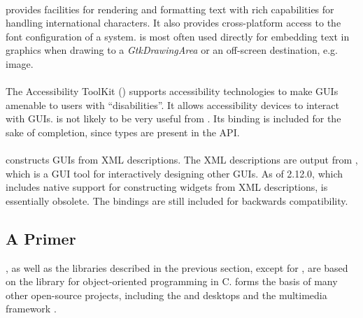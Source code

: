 \documentclass[article]{jss}
\begin{document}
\paragraph[Pango]{}

 provides facilities for rendering and formatting text with
rich capabilities for handling international characters. It also
provides cross-platform access to the font configuration of a system.
 is most often used directly for embedding text in graphics
when drawing to a \emph{GtkDrawingArea} or an off-screen destination,
e.g. image.

\paragraph[ATK]{} 

The Accessibility ToolKit () supports accessibility
technologies to make GUIs amenable to users with ``disabilities''.  It
allows accessibility devices to interact with 
GUIs.  is not likely to be very useful from . Its
binding is included for the sake of completion, since  types
are present in the  API.

\paragraph[Libglade]{}

 constructs  GUIs from XML descriptions.
The XML descriptions are output from
, which is a GUI tool for interactively designing other GUIs. 
As of  2.12.0, which includes native support for
constructing widgets from XML descriptions,  is
essentially obsolete. The bindings are still included for backwards
compatibility.

\subsection[A GObject Primer]{A 
Primer}\label{sec:primer}

, as well as the libraries described in the previous
section,
except for , are based on the  library for 
object-oriented programming in C.  forms the basis of
many other 
open-source projects, including the  \citep{GTK} and
\citep{xfce} desktops and the  multimedia framework
\citep{gstreamer}.
\end{document}
